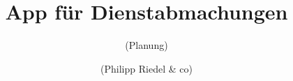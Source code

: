 

\newcommand{\trtitle}{App f\"ur Dienstabmachungen}
\newcommand{\scrartclScrreprt}{scrartcl}


\title{\trtitle}
\subtitle{(Planung)}
\author{(Philipp Riedel \& co)}

 
 



\maketitle


\tableofcontents
\thispagestyle{empty}
\newpage
{}












